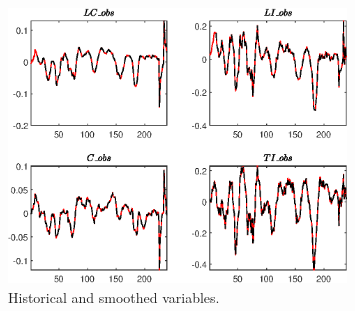  
\begin{figure}[H]
\centering 
\includegraphics[width=0.80\textwidth]{directed_search_est/graphs/directed_search_est_HistoricalAndSmoothedVariables1}
\caption{Historical and smoothed variables.}\label{Fig:HistoricalAndSmoothedVariables:1}
\end{figure}


